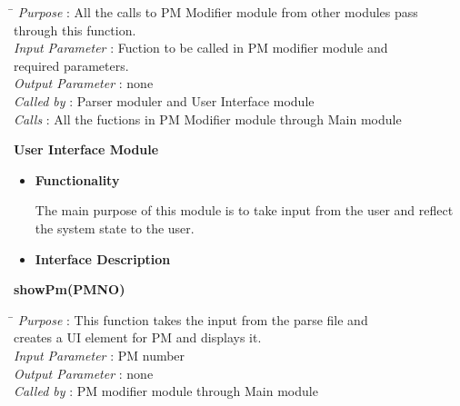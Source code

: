 \documentclass[a4paper,11pt]{article}
\begin{document}
\begin{itemize}
\begin{tabbing}
\hspace*{4cm}\= \kill
 \textit{Purpose} \> : All the calls to PM Modifier module from other modules pass \\ \>through this function.\\
  \textit{Input Parameter} \> : Fuction to be called in PM modifier module and \\ \>required parameters. \\
  \textit{Output Parameter} \> : none \\
  \textit{Called by} \> : Parser moduler and User Interface module \\
  \textit{Calls} \> : All the fuctions in PM Modifier module through Main module\\
\end{tabbing}
\end{itemize}
\textbf{User Interface Module}
\begin{itemize}
 \item \textbf{Functionality}
 
 The main purpose of this module is to take input from the user and reflect the system state to the user.
 \pagebreak
  \item \textbf{Interface Description}
  \end{itemize}
  \textbf{showPm(PM\textunderscore NO)} 
\begin{tabbing}
\hspace*{4cm}\= \kill
 \textit{Purpose} \> : This function takes the input from the parse file and \\ \>creates a UI element for PM and displays it.\\
  \textit{Input Parameter} \> : PM number \\
  \textit{Output Parameter} \> : none \\
  \textit{Called by} \> : PM modifier module through Main module
  
\end{tabbing}
\end{document}
